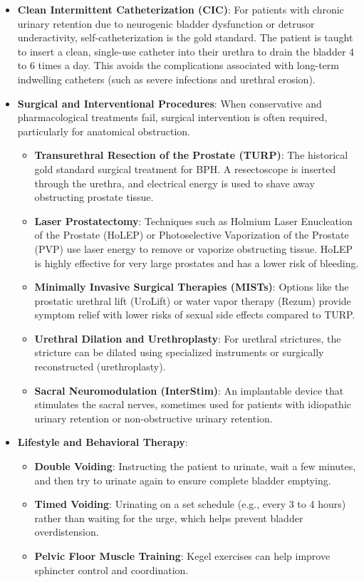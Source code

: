 \begin{itemize}
\begin{itemize}
    \end{itemize}
    \item \textbf{Clean Intermittent Catheterization (CIC)}: For patients with chronic urinary retention due to neurogenic bladder dysfunction or detrusor underactivity, self-catheterization is the gold standard. The patient is taught to insert a clean, single-use catheter into their urethra to drain the bladder 4 to 6 times a day. This avoids the complications associated with long-term indwelling catheters (such as severe infections and urethral erosion).
    \item \textbf{Surgical and Interventional Procedures}: When conservative and pharmacological treatments fail, surgical intervention is often required, particularly for anatomical obstruction.
    \begin{itemize}
        \item \textbf{Transurethral Resection of the Prostate (TURP)}: The historical gold standard surgical treatment for BPH. A resectoscope is inserted through the urethra, and electrical energy is used to shave away obstructing prostate tissue.
        \item \textbf{Laser Prostatectomy}: Techniques such as Holmium Laser Enucleation of the Prostate (HoLEP) or Photoselective Vaporization of the Prostate (PVP) use laser energy to remove or vaporize obstructing tissue. HoLEP is highly effective for very large prostates and has a lower risk of bleeding.
        \item \textbf{Minimally Invasive Surgical Therapies (MISTs)}: Options like the prostatic urethral lift (UroLift) or water vapor therapy (Rezum) provide symptom relief with lower risks of sexual side effects compared to TURP.
        \item \textbf{Urethral Dilation and Urethroplasty}: For urethral strictures, the stricture can be dilated using specialized instruments or surgically reconstructed (urethroplasty).
        \item \textbf{Sacral Neuromodulation (InterStim)}: An implantable device that stimulates the sacral nerves, sometimes used for patients with idiopathic urinary retention or non-obstructive urinary retention.
    \end{itemize}
    \item \textbf{Lifestyle and Behavioral Therapy}:
    \begin{itemize}
        \item \textbf{Double Voiding}: Instructing the patient to urinate, wait a few minutes, and then try to urinate again to ensure complete bladder emptying.
        \item \textbf{Timed Voiding}: Urinating on a set schedule (e.g., every 3 to 4 hours) rather than waiting for the urge, which helps prevent bladder overdistension.
        \item \textbf{Pelvic Floor Muscle Training}: Kegel exercises can help improve sphincter control and coordination.
    \end{itemize}
\end{itemize}

